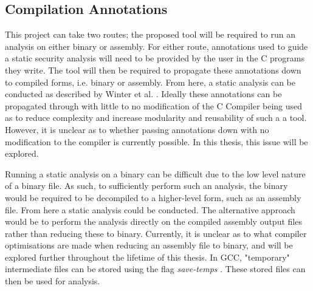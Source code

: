 \documentclass[twocolumn]{article}
\begin{document}
\subsection{Compilation Annotations}
This project can take two routes; the proposed tool will be required to run an analysis on either binary or assembly. For either route, annotations used to guide a static security analysis will need to be provided by the user in the C programs they write. The tool will then be required to propagate these annotations down to compiled forms, i.e. binary or assembly. From here, a static analysis can be conducted as described by Winter et al. \cite{winter2020information}. Ideally these annotations can be propagated through with little to no modification of the C Compiler being used as to reduce complexity and increase modularity and reusability of such a a tool. However, it is unclear as to whether passing annotations down with no modification to the compiler is currently possible. In this thesis, this issue will be explored. 

Running a static analysis on a binary can be difficult due to the low level nature of a binary file. As such, to sufficiently perform such an analysis, the binary would be required to be decompiled to a higher-level form, such as an assembly file. From here a static analysis could be conducted. The alternative approach would be to perform the analysis directly on the compiled assembly output files rather than reducing these to binary. Currently, it is unclear as to what compiler optimisations are made when reducing an assembly file to binary, and will be explored further throughout the lifetime of this thesis. In GCC, "temporary" intermediate files can be stored using the flag \textit{save-temps} \cite{gccdevoptions}. These stored files can then be used for analysis. 


\end{document}
